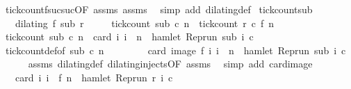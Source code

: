 \begin{isabellebody}
%
\isadelimproof
%
\endisadelimproof
%
\isatagproof
{}\isamarkupfalse%
\ tick{\isacharunderscore}count{\isacharunderscore}f{\isacharunderscore}suc{\isacharunderscore}suc{\isacharbrackleft}OF\ assms{\isacharbrackright}\ assms\ \isamarkupfalse%
\ {\isacharparenleft}simp\ add{\isacharcolon}\ dilating{\isacharunderscore}def{\isacharparenright}%
\endisatagproof
{\isafoldproof}%
%
\isadelimproof
\isanewline
%
\endisadelimproof
\isanewline
{}\isamarkupfalse%
\ tick{\isacharunderscore}count{\isacharunderscore}sub{\isacharcolon}\isanewline
\ \ \ {\isacartoucheopen}dilating\ f\ sub\ r{\isacartoucheclose}\isanewline
\ \ \ \ \ {\isacartoucheopen}tick{\isacharunderscore}count\ sub\ c\ n\ {\isacharequal}\ tick{\isacharunderscore}count\ r\ c\ {\isacharparenleft}f\ n{\isacharparenright}{\isacartoucheclose}\isanewline
%
\isadelimproof
%
\endisadelimproof
%
\isatagproof
{}\isamarkupfalse%
\ {\isacharminus}\isanewline
\ \ \isamarkupfalse%
\ {\isacartoucheopen}tick{\isacharunderscore}count\ sub\ c\ n\ {\isacharequal}\ card\ {\isacharbraceleft}i{\isachardot}\ i\ {\isasymle}\ n\ {\isasymand}\ hamlet\ {\isacharparenleft}{\isacharparenleft}Rep{\isacharunderscore}run\ sub{\isacharparenright}\ i\ c{\isacharparenright}{\isacharbraceright}{\isacartoucheclose}\isanewline
\ \ \ \ \isamarkupfalse%
\ tick{\isacharunderscore}count{\isacharunderscore}def{\isacharbrackleft}of\ {\isacartoucheopen}sub{\isacartoucheclose}\ {\isacartoucheopen}c{\isacartoucheclose}\ {\isacartoucheopen}n{\isacartoucheclose}{\isacharbrackright}\ \isacommand{{\isachardot}}\isamarkupfalse%
\isanewline
\ \ \isamarkupfalse%
\ \isamarkupfalse%
\ {\isacartoucheopen}{\isachardot}{\isachardot}{\isachardot}\ {\isacharequal}\ card\ {\isacharparenleft}image\ f\ {\isacharbraceleft}i{\isachardot}\ i\ {\isasymle}\ n\ {\isasymand}\ hamlet\ {\isacharparenleft}{\isacharparenleft}Rep{\isacharunderscore}run\ sub{\isacharparenright}\ i\ c{\isacharparenright}{\isacharbraceright}{\isacharparenright}{\isacartoucheclose}\isanewline
\ \ \ \ \isamarkupfalse%
\ assms\ dilating{\isacharunderscore}def\ dilating{\isacharunderscore}injects{\isacharbrackleft}OF\ assms{\isacharbrackright}\ \isamarkupfalse%
\ {\isacharparenleft}simp\ add{\isacharcolon}\ card{\isacharunderscore}image{\isacharparenright}\isanewline
\ \ \isamarkupfalse%
\ \isamarkupfalse%
\ {\isacartoucheopen}{\isachardot}{\isachardot}{\isachardot}\ {\isacharequal}\ card\ {\isacharbraceleft}i{\isachardot}\ i\ {\isasymle}\ f\ n\ {\isasymand}\ hamlet\ {\isacharparenleft}{\isacharparenleft}Rep{\isacharunderscore}run\ r{\isacharparenright}\ i\ c{\isacharparenright}{\isacharbraceright}{\isacartoucheclose}\isanewline

\end{isabellebody}
